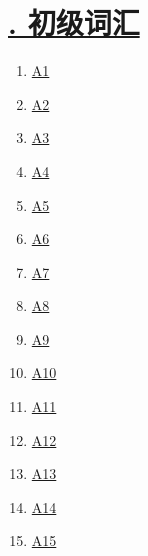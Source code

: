 \documentclass[11pt]{article}
\begin{document}
\newpage 

\vspace{-0.5cm}

\section*{\normalfont \large \href{https://www.youtube.com/watch?v=_8q3VWJB84o&list=PL7aIrlqqP5K_VeAi4oEExgri0o7VVBIXM}{. 初级词汇} }

\vspace{-0.5cm}

\begin{multicols}{5}
	\begin{enumerate}
		\item \href{https://mp.weixin.qq.com/s/VJDrAYnC1z_zjawdCWxBJw}{A1}	%
		\item \href{https://mp.weixin.qq.com/s/nEGXPZIPoAp7c7dmOlzv0Q}{A2}	%
		\item \href{https://mp.weixin.qq.com/s/LNZC3VfPbCxJoiCEsV7WGA}{A3}	%
		\item \href{https://mp.weixin.qq.com/s/c7K1SJ0XBU-S_kpv-oPOkg}{A4}	%
		\item \href{https://mp.weixin.qq.com/s/ZLcx_XDMZNpSHZaMe9fG8g}{A5}	%
		\item \href{https://mp.weixin.qq.com/s/Kg8-Zu7u7OE91_91tDnMOw}{A6}	%
		\item \href{https://mp.weixin.qq.com/s/oEraeqA4-M6uR_A2E4cWyQ}{A7}	%
		\item \href{https://mp.weixin.qq.com/s/Quzt3tL0ywpbUpaQ0Fk4KA}{A8}	%
		\item \href{https://mp.weixin.qq.com/s/PU5NbgotAIe_MS7_kXYXjg}{A9}	%
		\item \href{https://mp.weixin.qq.com/s/4915DVCYg0MldsLo4dsGXw}{A10}	%
		\item \href{https://mp.weixin.qq.com/s/1IVKqLjZh-bVL0BOqTAn3w}{A11}	%
		\item \href{https://mp.weixin.qq.com/s/uE8u2GDddiU-bbmODC1uvQ}{A12}	%
		\item \href{https://mp.weixin.qq.com/s/gJ90af6ZGS7-EWn7HcVnbg}{A13}	%
		\item \href{https://mp.weixin.qq.com/s/i0VCVzeYklqW1_C_XupwyQ}{A14}	%
		\item \href{https://mp.weixin.qq.com/s/7aV6UuaNoU1ZchqhK_NIZQ}{A15}	%
	\end{enumerate}
\end{multicols}
\end{document}
